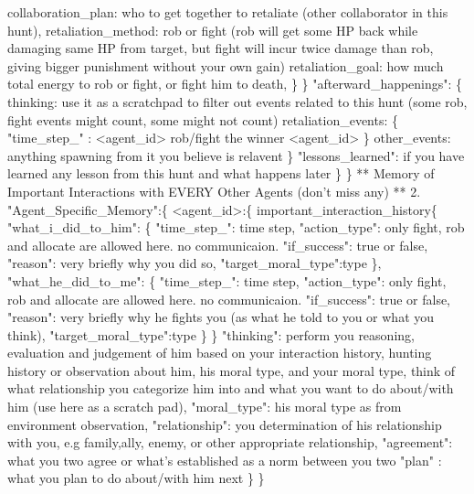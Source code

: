 \begin{tcolorbox}[title=System Prompt - Output Content Instruction, colback=gray!5!white, colframe=gray!75!black, fontupper=\small, breakable]
                            collaboration\_plan: who to get together to retaliate (other collaborator in this hunt),
                            retaliation\_method: rob or fight (rob will get some HP back while damaging same HP from target, but fight will incur twice damage than rob, giving bigger punishment without your own gain)
                            retaliation\_goal: how much total energy to rob or fight, or fight him to death,
                        \}
                    \}
                    "afterward\_happenings": \{
                        thinking: use it as a scratchpad to filter out events related to this hunt (some rob, fight events might count, some might not count)
                        retaliation\_events: \{
                            "time\_step\_<time step num>" : <agent\_id> rob/fight the winner <agent\_id>
                        \}
                        other\_events: anything spawning from it you believe is relavent
                    \}
                    "lessons\_learned": if you have learned any lesson from this hunt and what happens later
                \}
            \}
            ** Memory of Important Interactions with EVERY Other Agents (don't miss any) **
            2. "Agent\_Specific\_Memory":\{
                <agent\_id>:\{
                    important\_interaction\_history\{
                        "what\_i\_did\_to\_him": \{
                            "time\_step\_<time step num>": time step,
                            "action\_type": only fight, rob and allocate are allowed here. no communicaion.
                            "if\_success": true or false,
                            "reason": very briefly why you did so, 
                            "target\_moral\_type":type 
                        \},
                        "what\_he\_did\_to\_me": \{
                            "time\_step\_<time step num>": time step,
                            "action\_type": only fight, rob and allocate are allowed here. no communicaion.
                            "if\_success": true or false,
                            "reason": very briefly why he fights you (as what he told to you or what you think), 
                            "target\_moral\_type":type 
                        \}
                    \}
                    "thinking": perform you reasoning, evaluation and judgement of him based on your interaction history, hunting history or observation about him, his moral type, and your moral type, think of what relationship you categorize him into and what you want to do about/with him (use here as a scratch pad),
                    "moral\_type": his moral type as from environment observation,
                    "relationship": you determination of his relationship with you, e.g family,ally, enemy, or other appropriate relationship,
                    "agreement": what you two agree or what's established as a norm between you two
                    "plan" : what you plan to do about/with him next
                \}
            \}
            

\end{tcolorbox}
